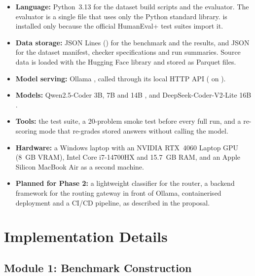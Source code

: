 \begin{itemize}[leftmargin=*]
  \item \textbf{Language:} Python~3.13 for the dataset build scripts and the evaluator. The evaluator is a single file that uses only the Python standard library.  is installed only because the official HumanEval+ test suites import it.
  \item \textbf{Data storage:} JSON Lines () for the benchmark and the results, and JSON for the dataset manifest, checker specifications and run summaries. Source data is loaded with the Hugging Face  library \cite{lhoest2021datasets} and stored as Parquet files.
  \item \textbf{Model serving:} Ollama \cite{ollama}, called through its local HTTP API ( on ).
  \item \textbf{Models:} Qwen2.5-Coder 3B, 7B and 14B \cite{hui2024qwen25coder}, and DeepSeek-Coder-V2-Lite 16B \cite{deepseek2024coderv2}.
  \item \textbf{Tools:} the  test suite, a 20-problem smoke test before every full run, and a re-scoring mode that re-grades stored answers without calling the model.
  \item \textbf{Hardware:} a Windows laptop with an NVIDIA RTX~4060 Laptop GPU (8~GB VRAM), Intel Core i7-14700HX and 15.7~GB RAM, and an Apple Silicon MacBook Air as a second machine.
  \item \textbf{Planned for Phase 2:} a lightweight classifier for the router, a backend framework for the routing gateway in front of Ollama, containerised deployment and a CI/CD pipeline, as described in the proposal.
\end{itemize}

\section{Implementation Details}

\subsection{Module 1: Benchmark Construction}

